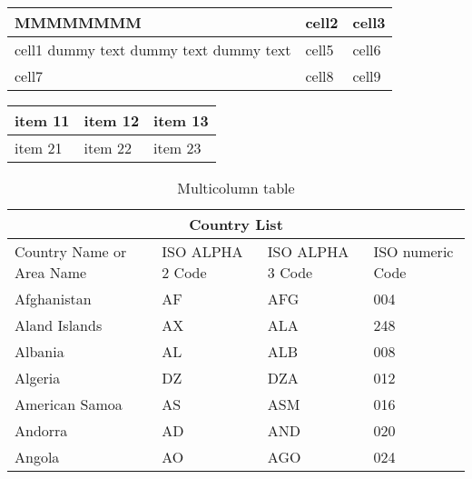 \documentclass{article}
\begin{document}
\vspace{1cm}

\begin{center}
\begin{tabular}{ | m{7em} | m{1cm}| m{1cm} | } 
  \hline
 MMMMMMMM& cell2 & cell3 \\ 
  \hline
  cell1 dummy text dummy text dummy text & cell5 & cell6 \\ [7ex]
  \hline
  cell7 & cell8 & cell9 \\ 
  \hline
\end{tabular}
\end{center}

\newpage

\begin{tabularx}{0.8\textwidth} { | >{\raggedright\arraybackslash}X | >{\centering\arraybackslash}X | >{\raggedleft\arraybackslash}X | }
   \hline
   item 11 & item 12 & item 13 \\[2ex]
   \hline
   item 21  & item 22  & item 23  \\
   \hline
\end{tabularx}


\newpage

\begin{table}[h!]
\caption{Multicolumn table}
\begin{tabular}{ |p{3cm}||p{3cm}|p{3cm}|p{3cm}|  }
 \hline
 \multicolumn{4}{|c|}{Country List} \\
 \hline
 Country Name	 or Area Name& ISO ALPHA 2 Code	&ISO ALPHA 3 Code&ISO numeric Code\\
 \hline
 Afghanistan	& AF	&AFG&	004\\
 Aland Islands&	AX	& ALA	&248\\
 Albania	&AL	& ALB&	008\\
 Algeria	&DZ	& DZA&	012\\
 American Samoa&	AS	& ASM&016\\
 Andorra&	AD	& AND	&020\\
 Angola&	AO	& AGO&024\\
  \hline
 \end{tabular}
 \end{table}
\end{document}
